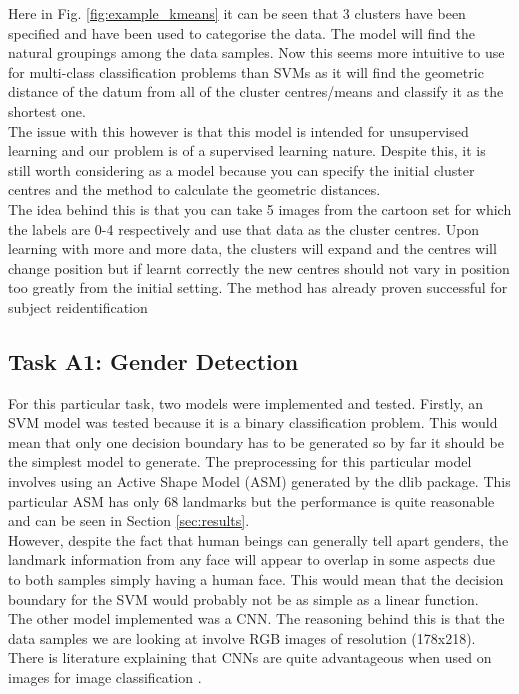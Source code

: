 \documentclass{article}
\begin{document}
	Here in Fig. \ref{fig:example_kmeans} it can be seen that 3 clusters have been specified and have been used to categorise the data. The model will find the natural groupings among the data samples. Now this seems more intuitive to use for multi-class classification problems than SVMs as it will find the geometric distance of the datum from all of the cluster centres/means and classify it as the shortest one.\\
	
	 The issue with this however is that this model is intended for unsupervised learning and our problem is of a supervised learning nature. Despite this, it is still worth considering as a model because you can specify the initial cluster centres and the method to calculate the geometric distances.\\
	 
	  The idea behind this is that you can take 5 images from the cartoon set for which the labels are 0-4 respectively and use that data as the cluster centres. Upon learning with more and more data, the clusters will expand and the centres will change position but if learnt correctly the new centres should not vary in position too greatly from the initial setting. The method has already proven successful for subject reidentification \cite{8227986}
	  
    \subsection{Task A1: Gender Detection}
    For this particular task, two models were implemented and tested. Firstly, an SVM model was tested because it is a binary classification problem. This would mean that only one decision boundary has to be generated so by far it should be the simplest model to generate. The preprocessing for this particular model involves using an Active Shape Model (ASM) generated by the dlib package. This particular ASM has only 68 landmarks but the performance is quite reasonable and can be seen in Section \ref{sec:results}. \\
    
    However, despite the fact that human beings can generally tell apart genders, the landmark information from any face will appear to overlap in some aspects due to both samples simply having a human face. This would mean that the decision boundary for the SVM would probably not be as simple as a linear function. \\
    
    The other model implemented was a CNN. The reasoning behind this is that the data samples we are looking at involve RGB images of resolution (178x218). There is literature \cite{8942386} explaining that CNNs are quite advantageous when used on images for image classification \cite{8295029}. 
\end{document}
